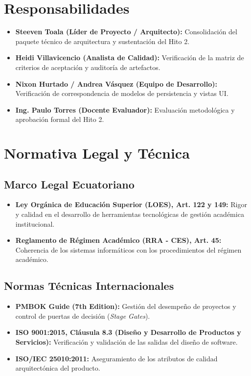 \documentclass[12pt,a4paper]{article}
\begin{document}
\section{Responsabilidades}
\begin{itemize}[leftmargin=1.5em, itemsep=2pt]
    \item \textbf{Steeven Toala (Líder de Proyecto / Arquitecto):} Consolidación del paquete técnico de arquitectura y sustentación del Hito 2.
    \item \textbf{Heidi Villavicencio (Analista de Calidad):} Verificación de la matriz de criterios de aceptación y auditoría de artefactos.
    \item \textbf{Nixon Hurtado / Andrea Vásquez (Equipo de Desarrollo):} Verificación de correspondencia de modelos de persistencia y vistas UI.
    \item \textbf{Ing. Paulo Torres (Docente Evaluador):} Evaluación metodológica y aprobación formal del Hito 2.
\end{itemize}

\section{Normativa Legal y Técnica}
\subsection{Marco Legal Ecuatoriano}
\begin{itemize}[leftmargin=1.5em, itemsep=2pt]
    \item \textbf{Ley Orgánica de Educación Superior (LOES), Art. 122 y 149:} Rigor y calidad en el desarrollo de herramientas tecnológicas de gestión académica institucional.
    \item \textbf{Reglamento de Régimen Académico (RRA - CES), Art. 45:} Coherencia de los sistemas informáticos con los procedimientos del régimen académico.
\end{itemize}
\subsection{Normas Técnicas Internacionales}
\begin{itemize}[leftmargin=1.5em, itemsep=2pt]
    \item \textbf{PMBOK Guide (7th Edition):} Gestión del desempeño de proyectos y control de puertas de decisión (\textit{Stage Gates}).
    \item \textbf{ISO 9001:2015, Cláusula 8.3 (Diseño y Desarrollo de Productos y Servicios):} Verificación y validación de las salidas del diseño de software.
    \item \textbf{ISO/IEC 25010:2011:} Aseguramiento de los atributos de calidad arquitectónica del producto.
\end{itemize}
\end{document}
